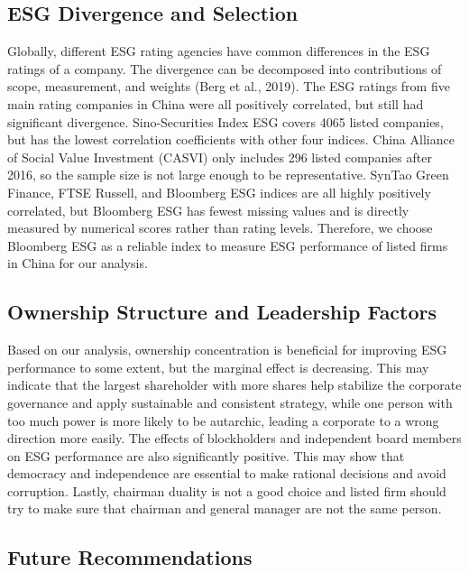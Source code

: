 \documentclass[
  12pt,
]{article}
\begin{document}
\hypertarget{esg-divergence-and-selection}{%
\subsection{ESG Divergence and
Selection}\label{esg-divergence-and-selection}}

Globally, different ESG rating agencies have common differences in the
ESG ratings of a company. The divergence can be decomposed into
contributions of scope, measurement, and weights (Berg et al., 2019).
The ESG ratings from five main rating companies in China were all
positively correlated, but still had significant divergence.
Sino-Securities Index ESG covers 4065 listed companies, but has the
lowest correlation coefficients with other four indices. China Alliance
of Social Value Investment (CASVI) only includes 296 listed companies
after 2016, so the sample size is not large enough to be representative.
SynTao Green Finance, FTSE Russell, and Bloomberg ESG indices are all
highly positively correlated, but Bloomberg ESG has fewest missing
values and is directly measured by numerical scores rather than rating
levels. Therefore, we choose Bloomberg ESG as a reliable index to
measure ESG performance of listed firms in China for our analysis.

\hypertarget{ownership-structure-and-leadership-factors}{%
\subsection{Ownership Structure and Leadership
Factors}\label{ownership-structure-and-leadership-factors}}

Based on our analysis, ownership concentration is beneficial for
improving ESG performance to some extent, but the marginal effect is
decreasing. This may indicate that the largest shareholder with more
shares help stabilize the corporate governance and apply sustainable and
consistent strategy, while one person with too much power is more likely
to be autarchic, leading a corporate to a wrong direction more easily.
The effects of blockholders and independent board members on ESG
performance are also significantly positive. This may show that
democracy and independence are essential to make rational decisions and
avoid corruption. Lastly, chairman duality is not a good choice and
listed firm should try to make sure that chairman and general manager
are not the same person.

\hypertarget{future-recommendations}{%
\subsection{Future Recommendations}\label{future-recommendations}}
\end{document}
